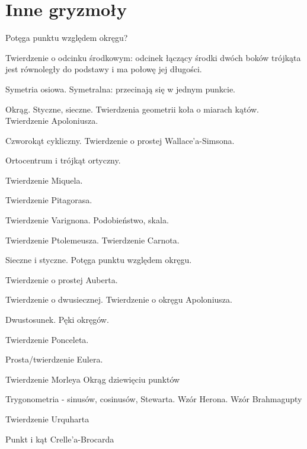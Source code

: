 \documentclass{parchment}
\begin{document}
\section{Inne gryzmoły}




Potęga punktu względem okręgu?

Twierdzenie o odcinku środkowym: odcinek łączący środki dwóch boków trójkąta jest równoległy do podstawy i ma połowę jej długości.

Symetria osiowa.
Symetralna: przecinają się w jednym punkcie.

Okrąg.
Styczne, sieczne.
Twierdzenia geometrii koła o miarach kątów.
Twierdzenie Apoloniusza.

Czworokąt cykliczny.
Twierdzenie o prostej Wallace'a-Simsona.

Ortocentrum i trójkąt ortyczny.

Twierdzenie Miquela.

Twierdzenie Pitagorasa.

Twierdzenie Varignona.
Podobieństwo, skala.

Twierdzenie Ptolemeusza.
Twierdzenie Carnota.

Sieczne i styczne.
Potęga punktu względem okręgu.

Twierdzenie o prostej Auberta.

Twierdzenie o dwusiecznej.
Twierdzenie o okręgu Apoloniusza.

Dwustosunek.
Pęki okręgów.

Twierdzenie Ponceleta.

Prosta/twierdzenie Eulera.

Twierdzenie Morleya
Okrąg dziewięciu punktów

Trygonometria - sinusów, cosinusów, Stewarta.
Wzór Herona.
Wzór Brahmagupty

Twierdzenie Urquharta

Punkt i kąt Crelle'a-Brocarda
\end{document}
